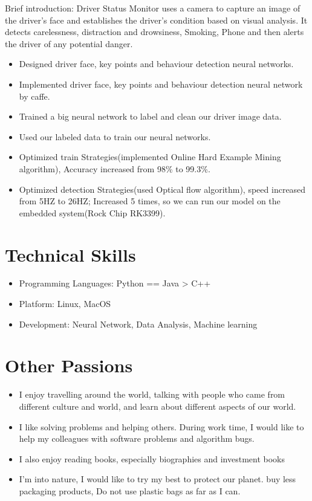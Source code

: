\documentclass{resume}
\begin{document}
Brief introduction: Driver Status Monitor uses a camera to capture an image of the driver’s face and establishes the driver’s condition based on visual analysis. It detects carelessness, distraction and drowsiness, Smoking, Phone and then alerts the driver of any potential danger.
\begin{itemize}
  \item Designed driver face, key points and behaviour detection neural networks.
  \item Implemented driver face, key points and behaviour detection neural network by caffe.
  \item Trained a big neural network to label and clean our driver image data.
  \item Used our labeled data to train our neural networks.
  \item Optimized train Strategies(implemented Online Hard Example Mining algorithm), Accuracy increased from 98\% to 99.3\%.
  \item Optimized detection Strategies(used Optical flow algorithm), speed increased from 5HZ to 26HZ; Increased 5 times, so we can run our model on the embedded system(Rock Chip RK3399).
\end{itemize}

\section{Technical Skills}
\begin{itemize}[parsep=0.5ex]
  \item Programming Languages: Python == Java > C++
  \item Platform: Linux, MacOS
  \item Development: Neural Network, Data Analysis, Machine learning
\end{itemize}

\section{Other Passions}
\begin{itemize}[parsep=0.5ex]
  \item I enjoy travelling around the world, talking with people who came from different culture and world, and learn about different aspects of our world.
  \item I like solving problems and helping others. During work time, I would like to help my colleagues with software problems and algorithm bugs.
  \item I also enjoy reading books, especially biographies and investment books
  \item I'm into nature, I would like to try my best to protect our planet. buy less packaging products, Do not use plastic bags as far as I can.
\end{itemize}
\end{document}
